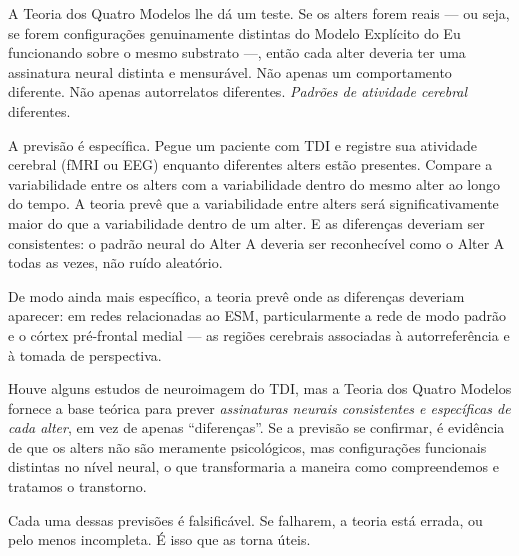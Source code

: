 \documentclass[11pt, twoside, openright]{book}
\begin{document}
A Teoria dos Quatro Modelos lhe dá um teste. Se os alters forem reais --- ou seja, se forem configurações genuinamente distintas do Modelo Explícito do Eu funcionando sobre o mesmo substrato ---, então cada alter deveria ter uma assinatura neural distinta e mensurável. Não apenas um comportamento diferente. Não apenas autorrelatos diferentes. \textit{Padrões de atividade cerebral} diferentes.

A previsão é específica. Pegue um paciente com TDI e registre sua atividade cerebral (fMRI ou EEG) enquanto diferentes alters estão presentes. Compare a variabilidade entre os alters com a variabilidade dentro do mesmo alter ao longo do tempo. A teoria prevê que a variabilidade entre alters será significativamente maior do que a variabilidade dentro de um alter. E as diferenças deveriam ser consistentes: o padrão neural do Alter A deveria ser reconhecível como o Alter A todas as vezes, não ruído aleatório.

De modo ainda mais específico, a teoria prevê onde as diferenças deveriam aparecer: em redes relacionadas ao ESM, particularmente a rede de modo padrão e o córtex pré-frontal medial --- as regiões cerebrais associadas à autorreferência e à tomada de perspectiva.

Houve alguns estudos de neuroimagem do TDI, mas a Teoria dos Quatro Modelos fornece a base teórica para prever \textit{assinaturas neurais consistentes e específicas de cada alter}, em vez de apenas ``diferenças''. Se a previsão se confirmar, é evidência de que os alters não são meramente psicológicos, mas configurações funcionais distintas no nível neural, o que transformaria a maneira como compreendemos e tratamos o transtorno.

Cada uma dessas previsões é falsificável. Se falharem, a teoria está errada, ou pelo menos incompleta. É isso que as torna úteis.
\end{document}
